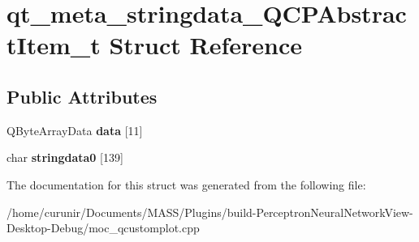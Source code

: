 \hypertarget{structqt__meta__stringdata___q_c_p_abstract_item__t}{}\section{qt\+\_\+meta\+\_\+stringdata\+\_\+\+Q\+C\+P\+Abstract\+Item\+\_\+t Struct Reference}
\label{structqt__meta__stringdata___q_c_p_abstract_item__t}
\subsection*{Public Attributes}
\begin{DoxyCompactItemize}
\item 
Q\+Byte\+Array\+Data {\bfseries data} \mbox{[}11\mbox{]}\hypertarget{structqt__meta__stringdata___q_c_p_abstract_item__t_a9e33f2a80b5df62d63aafd9326b07a92}{}\label{structqt__meta__stringdata___q_c_p_abstract_item__t_a9e33f2a80b5df62d63aafd9326b07a92}

\item 
char {\bfseries stringdata0} \mbox{[}139\mbox{]}\hypertarget{structqt__meta__stringdata___q_c_p_abstract_item__t_a4a1f8f9acd2583f039a05de696c20ba6}{}\label{structqt__meta__stringdata___q_c_p_abstract_item__t_a4a1f8f9acd2583f039a05de696c20ba6}

\end{DoxyCompactItemize}


The documentation for this struct was generated from the following file\+:\begin{DoxyCompactItemize}
\item 
/home/curunir/\+Documents/\+M\+A\+S\+S/\+Plugins/build-\/\+Perceptron\+Neural\+Network\+View-\/\+Desktop-\/\+Debug/moc\+\_\+qcustomplot.\+cpp\end{DoxyCompactItemize}

